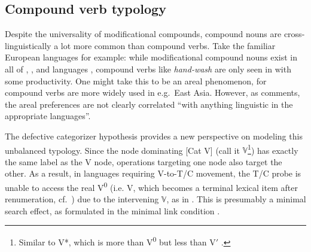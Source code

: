 \documentclass[output=paper]{langsci/langscibook}
\begin{document}
\subsection{Compound verb typology}\label{sec5.3}

Despite the universality of modificational compounds, compound nouns are\linebreak
cross-linguistically a lot more common than compound verbs. Take the familiar
Eu\-ro\-pean languages for example: while modificational compound nouns exist
in all of , , and  languages \citep[cf.][]{Bauer2009},
compound verbs like {\it hand-wash} are only seen in  with some
productivity. One might take this to be an areal phenomenon, for compound verbs
are more widely used in e.g.\ East Asia. However, as \citet[355]{Bauer2009}
comments, the areal preferences are not clearly correlated ``with anything
linguistic in the appropriate languages''.

The defective categorizer hypothesis provides a new perspective on modeling
this unbalanced typology. Since the node dominating
[Cat\textsubscript{\textsurd} V\textsubscript{\textsurd}] (call it
$\mathbb{V}$\footnote{Similar to  V*, which is more than
V\textsuperscript{0} but less than V$'$ \citep[cf.][]{Vikner2005}.}) has exactly
the same label as the V\textsubscript{\textsurd} node, operations targeting one
node also target the other. As a result, in languages requiring V-to-T/C
movement, the T/C probe is unable to access the real V\textsuperscript{0} (i.e.
V\textsubscript{\textsurd}, which becomes a terminal lexical item after
renumeration, cf.\ ) due to the intervening $\mathbb{V}$, as in
. This is presumably a minimal search effect, as formulated in the
minimal link condition .
\end{document}
